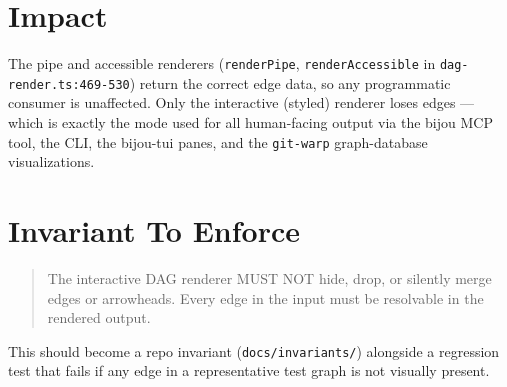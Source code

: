 



\section{Impact}\label{record-289-impact}

The pipe and accessible renderers (\texttt{r\allowbreak{}e\allowbreak{}n\allowbreak{}d\allowbreak{}e\allowbreak{}r\allowbreak{}P\allowbreak{}i\allowbreak{}p\allowbreak{}e}, \texttt{r\allowbreak{}e\allowbreak{}n\allowbreak{}d\allowbreak{}e\allowbreak{}r\allowbreak{}A\allowbreak{}c\allowbreak{}c\allowbreak{}e\allowbreak{}s\allowbreak{}s\allowbreak{}i\allowbreak{}b\allowbreak{}l\allowbreak{}e} in \texttt{d\allowbreak{}a\allowbreak{}g\allowbreak{}-\allowbreak{}r\allowbreak{}e\allowbreak{}n\allowbreak{}d\allowbreak{}e\allowbreak{}r\allowbreak{}.\allowbreak{}t\allowbreak{}s\allowbreak{}:\allowbreak{}4\allowbreak{}6\allowbreak{}9\allowbreak{}-\allowbreak{}5\allowbreak{}3\allowbreak{}0}) return the correct edge data, so any programmatic consumer is unaffected. Only the interactive (styled) renderer loses edges --- which is exactly the mode used for all human-facing output via the bijou MCP tool, the CLI, the bijou-tui panes, and the \texttt{g\allowbreak{}i\allowbreak{}t\allowbreak{}-\allowbreak{}w\allowbreak{}a\allowbreak{}r\allowbreak{}p} graph-database visualizations.

\section{Invariant To Enforce}\label{record-289-invariant-to-enforce}

\begin{quote}
The interactive DAG renderer MUST NOT hide, drop, or silently merge edges or arrowheads. Every edge in the input must be resolvable in the rendered output.
\end{quote}

This should become a repo invariant (\texttt{d\allowbreak{}o\allowbreak{}c\allowbreak{}s\allowbreak{}/\allowbreak{}i\allowbreak{}n\allowbreak{}v\allowbreak{}a\allowbreak{}r\allowbreak{}i\allowbreak{}a\allowbreak{}n\allowbreak{}t\allowbreak{}s\allowbreak{}/}) alongside a regression test that fails if any edge in a representative test graph is not visually present.

